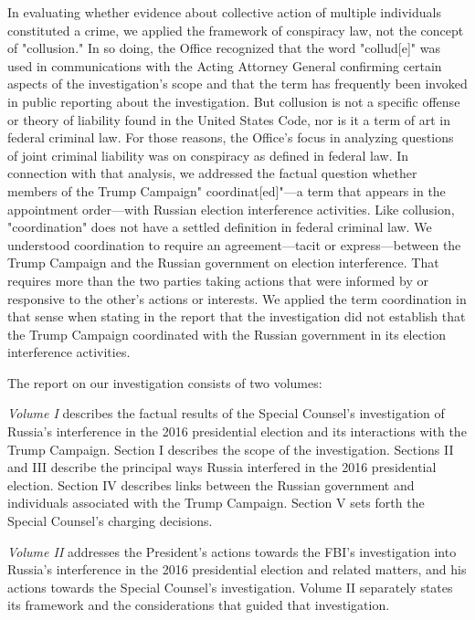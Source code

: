 In evaluating whether evidence about collective action of multiple individuals constituted a crime, we applied the framework of conspiracy law, not the concept of "collusion."
In so doing, the Office recognized that the word "collud[e]" was used in communications with the Acting Attorney General confirming certain aspects of the investigation's scope and that the term has frequently been invoked in public reporting about the investigation.
But collusion is not a specific offense or theory of liability found in the United States Code, nor is it a term of art in federal criminal law.
For those reasons, the Office's focus in analyzing questions of joint criminal liability was on conspiracy as defined in federal law.
In connection with that analysis, we addressed the factual question whether members of the Trump Campaign" coordinat[ed]"---a term that appears in the appointment order---with Russian election interference activities.
Like collusion, "coordination" does not have a settled definition in federal criminal law.
We understood coordination to require an agreement---tacit or express---between the Trump Campaign and the Russian government on election interference.
That requires more than the two parties taking actions that were informed by or responsive to the other's actions or interests.
We applied the term coordination in that sense when stating in the report that the investigation did not establish that the Trump Campaign coordinated with the Russian government in its election interference activities.

\hr

The report on our investigation consists of two volumes:

\textit{Volume I} describes the factual results of the Special Counsel's investigation of Russia's interference in the 2016 presidential election and its interactions with the Trump Campaign.
Section I describes the scope of the investigation.
Sections II and III describe the principal ways Russia interfered in the 2016 presidential election.
Section IV describes links between the Russian government and individuals associated with the Trump Campaign.
Section V sets forth the Special Counsel's charging decisions.

\textit{Volume II} addresses the President's actions towards the FBI's investigation into Russia's interference in the 2016 presidential election and related matters, and his actions towards the Special Counsel's investigation.
Volume II separately states its framework and the considerations that guided that investigation.
